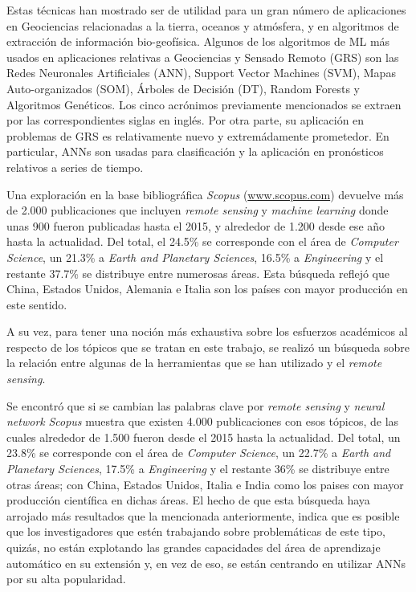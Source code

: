     \par Estas técnicas han mostrado ser de utilidad para un gran número de
      aplicaciones en Geociencias relacionadas a la tierra, oceanos y atmósfera,
      y en algoritmos de extracción de información bio-geofísica.
      Algunos de los algoritmos de ML más usados en aplicaciones relativas a
      Geociencias y Sensado Remoto (GRS) son las Redes Neuronales Artificiales (ANN),
      Support Vector Machines (SVM), Mapas Auto-organizados (SOM), Árboles de Decisión (DT),
      Random Forests y Algoritmos Genéticos. Los cinco acrónimos previamente mencionados
      se extraen por las correspondientes siglas en inglés.
      Por otra parte, su aplicación en problemas de GRS es
      relativamente nuevo y extremádamente prometedor. En particular, ANNs son
      usadas para clasificación y la aplicación en pronósticos
      relativos a series de tiempo.

    \par Una exploración en la base bibliográfica \textit{Scopus} (\url{www.scopus.com})
      devuelve más de 2.000 publicaciones que incluyen \textit{remote sensing} y
      \textit{machine learning} donde unas 900 fueron publicadas hasta el 2015, y
      alrededor de 1.200 desde ese año hasta la actualidad. Del total, el 24.5\% se
      corresponde con el área de \textit{Computer Science}, un 21.3\% a
      \textit{Earth and Planetary Sciences}, 16.5\% a \textit{Engineering} y el
      restante 37.7\% se distribuye entre numerosas áreas. Esta búsqueda reflejó
      que China, Estados Unidos, Alemania e Italia son los países con mayor
      producción en este sentido.

    \par A su vez, para tener una noción más exhaustiva sobre los esfuerzos académicos
      al respecto de los tópicos que se tratan en este trabajo, se realizó un búsqueda
      sobre la relación entre algunas de la herramientas que se han utilizado y
      el \textit{remote sensing}.

    \par Se encontró que si se cambian las palabras clave por
      \textit{remote sensing} y \textit{neural network} \textit{Scopus} muestra
      que existen 4.000 publicaciones con esos tópicos, de las cuales alrededor de
      1.500 fueron desde el 2015 hasta la actualidad. Del total, un 23.8\% se
      corresponde con el área de \textit{Computer Science}, un 22.7\% a
      \textit{Earth and Planetary Sciences}, 17.5\% a \textit{Engineering} y el
      restante 36\% se distribuye entre otras áreas; con China,
      Estados Unidos, Italia e India como los paises con mayor producción
      científica en dichas áreas.
      El hecho de que esta búsqueda haya arrojado más resultados que la mencionada
      anteriormente, indica que es posible que los investigadores que estén trabajando
      sobre problemáticas de este tipo, quizás, no están explotando las grandes
      capacidades del área de aprendizaje automático en su extensión y, en vez de
      eso, se están centrando en utilizar ANNs por su alta popularidad.

